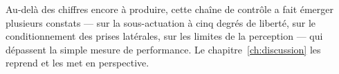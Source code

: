Au-delà des chiffres encore à produire, cette chaîne de contrôle a fait émerger
plusieurs constats — sur la sous-actuation à cinq degrés de liberté, sur le
conditionnement des prises latérales, sur les limites de la perception — qui
dépassent la simple mesure de performance. Le chapitre~\ref{ch:discussion} les
reprend et les met en perspective.
